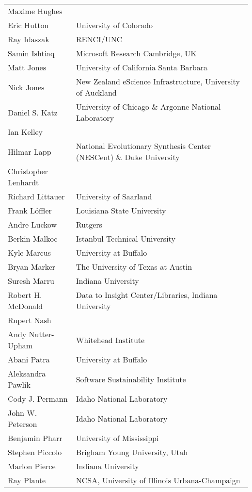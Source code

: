 \documentclass[11pt, oneside]{amsart}
\begin{document}
{\begin{longtable}{ll}
\\ Maxime Hughes
\\ Eric Hutton           &  University of Colorado
\\ Ray Idaszak           &  RENCI/UNC
\\ Samin Ishtiaq         &  Microsoft Research Cambridge, UK
\\ Matt Jones            &  University of California Santa Barbara
\\ Nick Jones            &  New Zealand eScience Infrastructure, University of Auckland
\\ Daniel S. Katz        &  University of Chicago \& Argonne National Laboratory
\\ Ian Kelley
\\ Hilmar Lapp           &  National Evolutionary Synthesis Center (NESCent) \& Duke University
\\ Christopher Lenhardt
\\ Richard Littauer      &  University of Saarland
\\ Frank L\"{o}ffler     &  Louisiana State University
\\ Andre Luckow          &  Rutgers
\\ Berkin Malkoc         &  Istanbul Technical University
\\ Kyle Marcus           &  University at Buffalo
\\ Bryan Marker          &  The University of Texas at Austin
\\ Suresh Marru          &  Indiana University
\\ Robert H. McDonald    &  Data to Insight Center/Libraries, Indiana University
\\ Rupert Nash
\\ Andy Nutter-Upham     &  Whitehead Institute
\\ Abani Patra           &  University at Buffalo
\\ Aleksandra Pawlik     &  Software Sustainability Institute
\\ Cody J. Permann       &  Idaho National Laboratory
\\ John W. Peterson      &  Idaho National Laboratory
\\ Benjamin Pharr        &  University of Mississippi
\\ Stephen Piccolo       &  Brigham Young University, Utah
\\ Marlon Pierce         &  Indiana University
\\ Ray Plante            &  NCSA, University of Illinois Urbana-Champaign

\end{longtable}}
\end{document}
